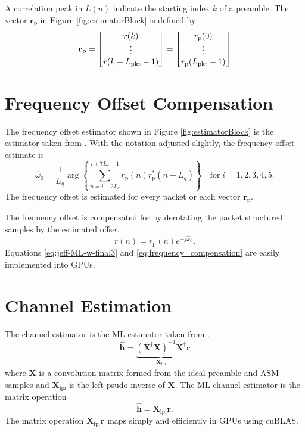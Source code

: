 A correlation peak in $L(u)$ indicate the starting index $k$ of a preamble.
The vector $\mathbf{r}_\text{p}$ in Figure \ref{fig:estimatorBlock} is defined by
\begin{equation}
\mathbf{r}_\text{p} = 
\begin{bmatrix}
r(k) \\ 
\vdots \\ 
r(k+L_\text{pkt}-1)
\end{bmatrix}
=
\begin{bmatrix}
r_\text{p}(0) \\ 
\vdots \\ 
r_\text{p}(L_\text{pkt}-1)
\end{bmatrix}
\end{equation}

\section{Frequency Offset Compensation}
The frequency offset estimator shown in Figure \ref{fig:estimatorBlock} is the estimator taken from \cite[eq. (24)]{rice2014frequency}.
With the notation adjusted slightly, the frequency offset estimate is
\begin{equation}
	\hat{\omega}_0 = \frac{1}{L_q} \arg\left\{ \sum_{n=i+2L_q}^{i+7L_q-1} r_\text{p}(n)r_\text{p}^\ast(n-L_q)\right\}
	\quad
\text{for} \;
i=1,2,3,4,5.
	\label{eq:jeff-ML-w-final3}
\end{equation}
The frequency offset is estimated for every packet or each vector $\mathbf{r}_\text{p}$.

The frequency offset is compensated for by derotating the packet structured samples by the estimated offset
\begin{equation}
	r(n) = r_\text{p}(n) e^{-j\hat{\omega}_0}.
	\label{eq:frequency_compensation}
\end{equation}
Equations \eqref{eq:jeff-ML-w-final3} and \eqref{eq:frequency_compensation} are easily implemented into GPUs. 

\section{Channel Estimation}
\label{sec:channel_estimation}
The channel estimator is the ML estimator taken from \cite[eq. 8]{rice-afran-saquib-cole-rhodes-moazzami:2014}.
\begin{equation}
\hat{\mathbf{h}} = \underbrace{ \left( \mathbf{X}^\dag\mathbf{X} \right)^{-1} \mathbf{X}^\dag}_{\mathbf{X}_\text{lpi}}\mathbf{r}
\end{equation}
where $\mathbf{X}$ is a convolution matrix formed from the ideal preamble and ASM samples
and $\mathbf{X}_\text{lpi}$ is the left psudo-inverse of $\mathbf{X}$.
The ML channel estimator is the matrix operation
\begin{equation}
\hat{\mathbf{h}} = \mathbf{X}_\text{lpi} \mathbf{r}.
\end{equation}
The matrix operation $\mathbf{X}_\text{lpi} \mathbf{r}$ maps simply and efficiently in GPUs using cuBLAS.


